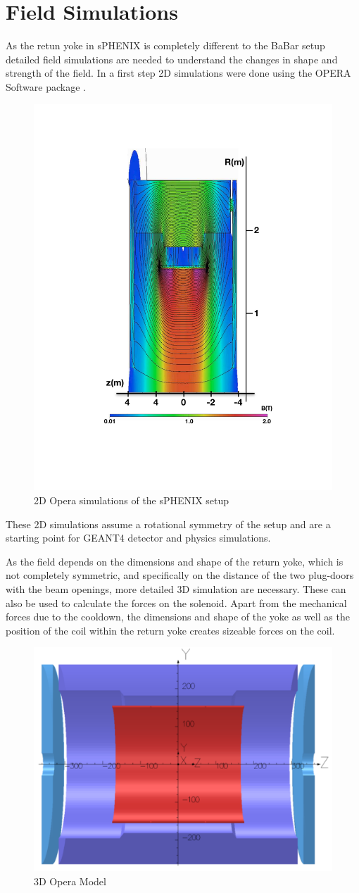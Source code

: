 \section{Field Simulations}
\label{Field_Simulations}
 
As the retun yoke in sPHENIX is completely different to the BaBar setup detailed
field simulations are needed to understand the changes in shape and
strength of the field. In a first step 2D simulations were done using the OPERA Software
package \cite{Opera}.

\begin{figure}[]
  \begin{center}
    \includegraphics[width=0.5\linewidth,height=0.4\textwidth]{figs/2DSimulation.pdf}
    \caption{2D Opera simulations of the sPHENIX setup}
    \label{Opera2D}
  \end{center}
\end{figure}

These 2D simulations assume a rotational symmetry of the setup and are
a starting point for GEANT4 detector and physics simulations.

As the field depends on the
dimensions and shape of the return yoke, which is not completely symmetric, 
and specifically on the distance of the two
plug-doors with the beam openings, more detailed 3D simulation
are necessary. These can also be used to calculate the forces on the
solenoid. Apart from the mechanical forces due to the
cooldown, the dimensions and shape of the yoke as well as the position
of the coil within the return yoke creates
sizeable forces  on the coil.

\begin{figure}[]
  \begin{center}
    \includegraphics[width=0.5\linewidth, height=0.3\textwidth]{figs/Magnet3DModel.pdf}
    \caption{3D Opera Model}
    \label{Opera2D}
  \end{center}
\end{figure}

